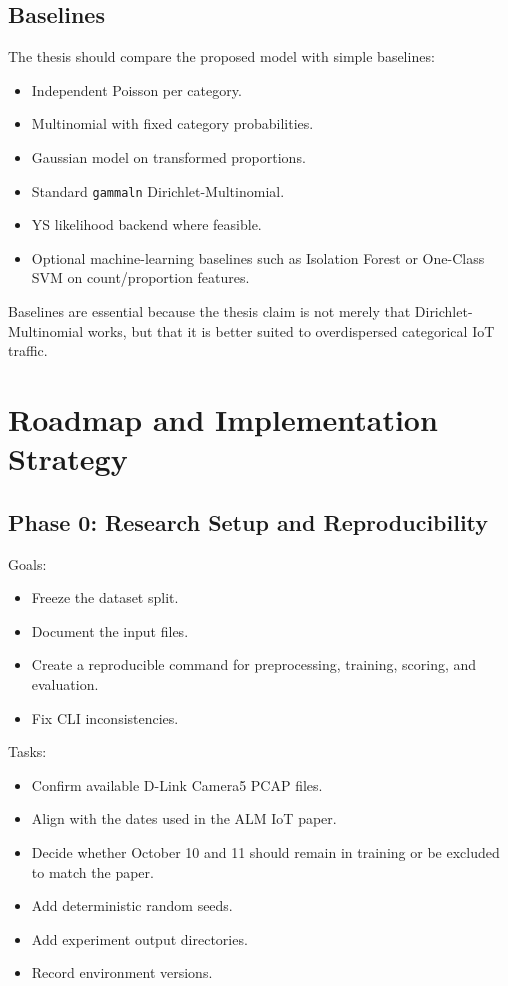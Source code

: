 \documentclass[11pt,a4paper]{article}
\begin{document}
\subsection{Baselines}

The thesis should compare the proposed model with simple baselines:

\begin{itemize}
  \item Independent Poisson per category.
  \item Multinomial with fixed category probabilities.
  \item Gaussian model on transformed proportions.
  \item Standard \texttt{gammaln} Dirichlet-Multinomial.
  \item YS likelihood backend where feasible.
  \item Optional machine-learning baselines such as Isolation Forest or One-Class SVM on count/proportion features.
\end{itemize}

Baselines are essential because the thesis claim is not merely that Dirichlet-Multinomial works, but that it is better suited to overdispersed categorical IoT traffic.

\section{Roadmap and Implementation Strategy}

\subsection{Phase 0: Research Setup and Reproducibility}

Goals:

\begin{itemize}
  \item Freeze the dataset split.
  \item Document the input files.
  \item Create a reproducible command for preprocessing, training, scoring, and evaluation.
  \item Fix CLI inconsistencies.
\end{itemize}

Tasks:

\begin{itemize}
  \item Confirm available D-Link Camera5 PCAP files.
  \item Align  with the dates used in the ALM IoT paper.
  \item Decide whether October 10 and 11 should remain in training or be excluded to match the paper.
  \item Add deterministic random seeds.
  \item Add experiment output directories.
  \item Record environment versions.
\end{itemize}
\end{document}
